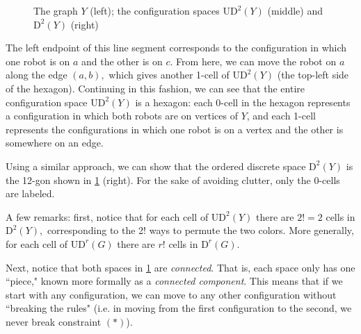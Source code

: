 \documentclass{amsart}
\newcommand{\D}{\mathrm{D}}
\newcommand{\UD}{\mathrm{UD}}
\theoremstyle{definition}
\theoremstyle{remark}
\begin{document}
\begin{figure}[h!]
    \caption{The graph $Y$ (left); the configuration spaces $\UD^2(Y)$ (middle) and $\D^2(Y)$ (right)}
    \label{fig:UD2Y}
\end{figure}

The left endpoint of this line segment corresponds to the configuration in which one robot is on $a$ and the other is on $c.$ From here, we can move the robot on $a$ along the edge $(a,b),$ which gives another 1-cell of $\UD^2(Y)$ (the top-left side of the hexagon). Continuing in this fashion, we can see that the entire configuration space $\UD^2(Y)$ is a hexagon: each 0-cell in the hexagon represents a configuration in which both robots are on vertices of $Y$, and each 1-cell represents the configurations in which one robot is on a vertex and the other is somewhere on an edge.

Using a similar approach, we can show that the ordered discrete space $\D^2(Y)$ is the 12-gon shown in \cref{fig:UD2Y} (right). For the sake of avoiding clutter, only the 0-cells are labeled.

A few remarks: first, notice that for each cell of $\UD^2(Y)$ there are $2!=2$ cells in $\D^2(Y),$ corresponding to the 2! ways to permute the two colors. More generally, for each cell of $\UD^r(G)$ there are $r!$ cells in $\D^r(G).$

Next, notice that both spaces in \cref{fig:UD2Y} are \textit{connected}. That is, each space only has one ``piece," known more formally as a \textit{connected component}. This means that if we start with any configuration, we can move to any other configuration without ``breaking the rules" (i.e. in moving from the first configuration to the second, we never break constraint $(\ast)$). 
\end{document}
